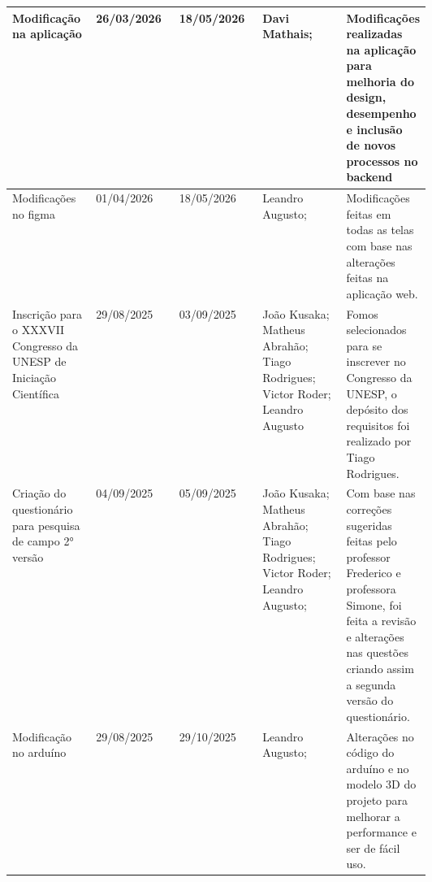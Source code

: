 \documentclass[
landscape,
  a4paper,
  12pt,
  english,
  brazilian,
]{article}
\begin{document}
 \begin{table}[]
\centering


\begin{tabular}{|>{\raggedright\arraybackslash}p{0.2\linewidth}|l|l|>{\raggedright\arraybackslash}p{0.2\linewidth}|>{\raggedright\arraybackslash}p{0.2\linewidth}|}

\hline
 Modificação na aplicação&                            26/03/2026&                18/05/2026&                 Davi Mathais;&                                 Modificações realizadas na aplicação para melhoria do design, desempenho e inclusão de novos processos no backend\\ \hline
                  Modificações no figma&                            01/04/2026&               18/05/2026&                 Leandro Augusto;&                                  Modificações feitas em todas as telas com base nas alterações feitas na aplicação web.\\ \hline
                  Inscrição para o XXXVII Congresso da UNESP de Iniciação Científica& 29/08/2025& 03/09/2025& João Kusaka; Matheus Abrahão; Tiago Rodrigues; Victor Roder; Leandro Augusto &Fomos selecionados para se inscrever no Congresso da UNESP, o depósito dos requisitos foi realizado por Tiago Rodrigues.\\\hline
                  Criação do questionário para pesquisa de campo 2° versão&                            04/09/2025&                05/09/2025&                 João Kusaka; Matheus Abrahão; Tiago Rodrigues; Victor Roder; Leandro Augusto;&                                  Com base nas correções sugeridas feitas pelo professor Frederico e professora Simone, foi feita a revisão e alterações nas questões criando assim a segunda versão do questionário.\\ \hline
                  Modificação no arduíno&                            29/08/2025&                29/10/2025&                  Leandro Augusto;&                                 Alterações no código do arduíno e no modelo 3D do projeto para melhorar a performance e ser de fácil uso.\\ \hline
 
\end{tabular}


\end{table}
\end{document}
